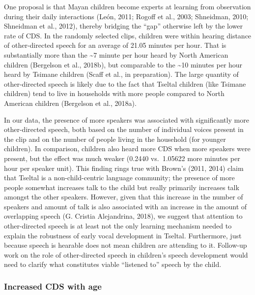 \documentclass[floatsintext,man]{apa6}
\theoremstyle{definition}
\theoremstyle{definition}
\theoremstyle{definition}
\theoremstyle{remark}
\begin{document}
One proposal is that Mayan children become experts at learning from
observation during their daily interactions (León, 2011; Rogoff et al.,
2003; Shneidman, 2010; Shneidman et al., 2012), thereby bridging the
\enquote{gap} otherwise left by the lower rate of CDS. In the randomly
selected clips, children were within hearing distance of other-directed
speech for an average of 21.05 minutes per hour. That is substantially
more than the \textasciitilde{}7 minute per hour heard by North American
children (Bergelson et al., 2018b), but comparable to the
\textasciitilde{}10 minutes per hour heard by Tsimane children (Scaff et
al., in preparation). The large quantity of other-directed speech is
likely due to the fact that Tseltal children (like Tsimane children)
tend to live in households with more people compared to North American
children (Bergelson et al., 2018a).

In our data, the presence of more speakers was associated with
significantly more other-directed speech, both based on the number of
individual voices present in the clip and on the number of people living
in the household (for younger children). In comparison, children also
heard more CDS when more speakers were present, but the effect was much
weaker (0.2440 vs.~1.05622 more minutes per hour per speaker unit). This
finding rings true with Brown's (2011, 2014) claim that Tseltal is a
non-child-centric language community; the presence of more people
somewhat increases talk to the child but really primarily increases talk
amongst the other speakers. However, given that this increase in the
number of speakers and amount of talk is also associated with an
increase in the amount of overlapping speech (G. Cristia Alejandrina,
2018), we suggest that attention to other-directed speech is at least
not the only learning mechanism needed to explain the robustness of
early vocal development in Tseltal. Furthermore, just because speech is
hearable does not mean children are attending to it. Follow-up work on
the role of other-directed speech in children's speech development would
need to clarify what constitutes viable \enquote{listened to} speech by
the child.

\subsubsection{Increased CDS with age}\label{increased-cds-with-age}
\end{document}
